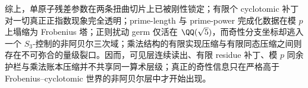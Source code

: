 综上，单原子残差参数在两条扭曲切片上已被刚性锁定；有限个 cyclotomic 补丁对一切真正正指数现象完全透明；prime-length 与 prime-power 完成化数据在模 \(p\) 上塌缩为 Frobenius 塔；正则扰动 germ 仅活在 \(\QQ(\sqrt5)\)，而奇性分支坐标却逃入一个 \(S_3\)-控制的非阿贝尔三次域；乘法结构的有限实现压缩与有限同态压缩之间则存在不可弥合的量级裂口。因而，可见层连续读出、有限 residue 补丁、模 \(p\) 同余护栏与乘法账本压缩并不共享同一算术层级；真正的奇性信息只在严格高于 Frobenius--cyclotomic 世界的非阿贝尔层中才开始出现。
